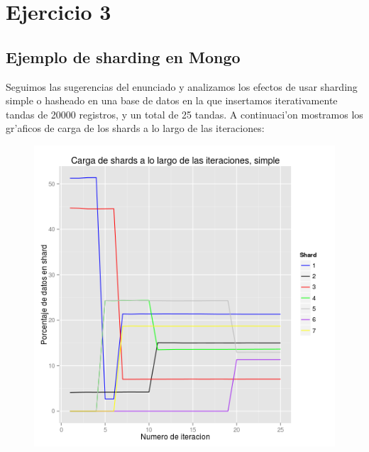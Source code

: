 \section{Ejercicio 3}

\subsection{Ejemplo de sharding en Mongo}

Seguimos las sugerencias del enunciado y analizamos los efectos de usar sharding simple o hasheado en una base de datos en la que insertamos iterativamente tandas de 20000 registros, y un total de 25 tandas. A continuaci'on mostramos los gr'aficos de carga de los shards a lo largo de las iteraciones:

\begin{figure}[H]
	\begin{center}
		\includegraphics[scale=0.6]{imagenes/siete_shards_simple.png}
	\end{center}
\end{figure}

